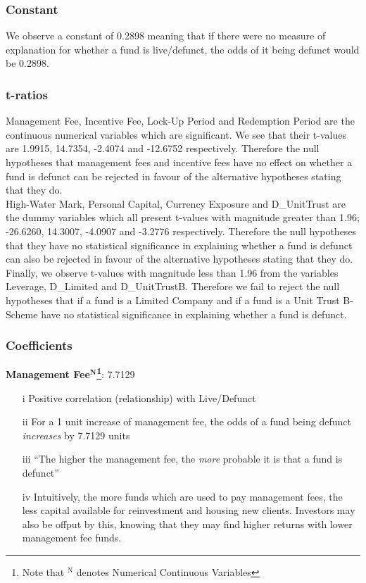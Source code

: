 \documentclass[11pt, english]{article}
\begin{document}
		\subsubsection{Constant}

	We observe a constant of 0.2898 meaning that if there were no measure of explanation for whether a fund is live/defunct, the odds of it being defunct would be 0.2898.

		\subsubsection{t-ratios}

	Management Fee, Incentive Fee, Lock-Up Period and Redemption Period are the continuous numerical variables which are significant. We see that their t-values are 1.9915, 14.7354, -2.4074 and -12.6752 respectively. Therefore the null hypotheses that management fees and incentive fees have no effect on whether a fund is defunct can be rejected in favour of the alternative hypotheses stating that they do.\\

	High-Water Mark, Personal Capital, Currency Exposure and D\_UnitTrust are the dummy variables which all present t-values with magnitude greater than 1.96; -26.6260, 14.3007, -4.0907 and -3.2776 respectively. Therefore the null hypotheses that they have no statistical significance in explaining whether a fund is defunct can also be rejected in favour of the alternative hypotheses stating that they do.\\

	Finally, we observe t-values with magnitude less than 1.96 from the variables Leverage, D\_Limited and D\_UnitTrustB. Therefore we fail to reject the null hypotheses that if a fund is a Limited Company and if a fund is a Unit Trust B-Scheme have no statistical significance in explaining whether a fund is defunct.

		\subsubsection{Coefficients}

	\textbf{Management Fee$\mathbf{^N}$\footnote{Note that $\mathrm{^N}$ denotes Numerical Continuous Variables}}: 7.7129

	\begin{itemize}
	\setlength\itemsep{0cm}
		\item[i] Positive correlation (relationship) with Live/Defunct
		\item[ii] For a 1 unit increase of management fee, the odds of a fund being defunct \textit{increases} by 7.7129 units
		\item[iii] ``The higher the management fee, the \textit{more} probable it is that a fund is defunct'' 
		\item[iv] Intuitively, the more funds which are used to pay management fees, the less capital available for reinvestment and housing new clients. Investors may also be offput by this, knowing that they may find higher returns with lower management fee funds.
	\end{itemize}
\end{document}

